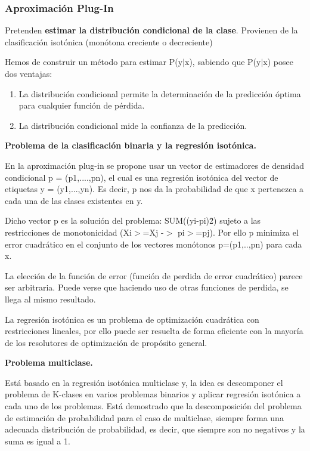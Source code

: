 \subsubsection{Aproximación Plug-In}

Pretenden \textbf{estimar la distribución condicional de la clase}. Provienen de la
clasificación isotónica (monótona creciente o decreciente)

Hemos de construir un método para estimar P(y$|$x), sabiendo que P(y$|$x) posee
dos ventajas:
\begin{enumerate}
	\item La distribución condicional permite la determinación de la predicción 
	óptima para cualquier función de pérdida.
	\item La distribución condicional mide la confianza de la predicción.
\end{enumerate}


\textbf{Problema de la clasificación binaria y la regresión isotónica.}

En la aproximación plug-in se propone usar un vector de estimadores de densidad
condicional p = (p1,....,pn), el cual es una regresión isotónica del vector de
etiquetas y = (y1,...,yn). Es decir, p nos da la probabilidad de que x 
pertenezca a cada una de las clases existentes en y.

Dicho vector p es la solución del problema: SUM((yi-pi)\^2) sujeto a las restricciones de
monotonicidad (Xi$>$=Xj -$>$ pi$>$=pj). Por ello p minimiza el error cuadrático en 
el conjunto de los vectores monótonos p=(p1,..,pn) para cada x.

La elección de la función de error (función de perdida de error cuadrático)
parece ser arbitraria. Puede verse que haciendo uso de otras funciones
de perdida, se llega al mismo resultado.

La regresión isotónica es un problema de optimización cuadrática con 
restricciones lineales, por ello puede ser resuelta de forma eficiente con
la mayoría de los resolutores de optimización de propósito general.

\textbf{Problema multiclase.}

Está basado en la regresión isotónica multiclase y, la idea es descomponer el problema de K-clases en varios problemas binarios
y aplicar regresión isotónica a cada uno de los problemas.
Está demostrado que la descomposición del problema de estimación de 
probabilidad para el caso de multiclase, siempre forma una adecuada 
distribución de probabilidad, es decir, que siempre son no negativos
y la suma es igual a 1.


